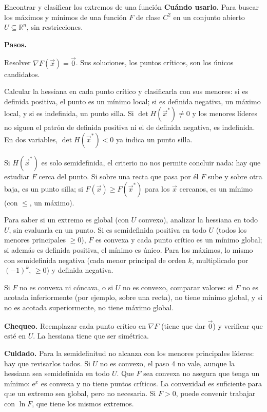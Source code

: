 \documentclass{article}
\newcommand{\rotulo}[2][principal]{\textsf{\bfseries\color{#1}#2}\enspace}
\newcommand{\R}{\ensuremath{\mathbb{R}}}
\newcommand{\vect}[1]{\vec{#1}}
\begin{document}
\begin{metodo}[label=met:opt-libre]{Encontrar y clasificar los extremos de una función}
\rotulo{Cuándo usarlo.} Para buscar los máximos y mínimos de una función \(F\) de clase \(C^2\) en un conjunto abierto \(U\subseteq\R^n\), sin restricciones.

\rotulo{Pasos.}
\begin{pasos}
  \item Resolver \(\nabla F(\vect{x})=\vect{0}\). Sus soluciones, los puntos críticos, son los únicos candidatos.
  \item Calcular la hessiana en cada punto crítico y clasificarla con sus menores: si es definida positiva, el punto es un mínimo local; si es definida negativa, un máximo local, y si es indefinida, un punto silla. Si \(\det H(\vect{x}^*)\neq0\) y los menores líderes no siguen el patrón de definida positiva ni el de definida negativa, es indefinida. En dos variables, \(\det H(\vect{x}^*)<0\) ya indica un punto silla.
  \item Si \(H(\vect{x}^*)\) es solo semidefinida, el criterio no nos permite concluir nada: hay que estudiar \(F\) cerca del punto. Si sobre una recta que pasa por él \(F\) sube y sobre otra baja, es un punto silla; si \(F(\vect{x})\ge F(\vect{x}^*)\) para los \(\vect{x}\) cercanos, es un mínimo (con \(\le\), un máximo).
  \item Para saber si un extremo es global (con \(U\) convexo), analizar la hessiana en todo \(U\), sin evaluarla en un punto. Si es semidefinida positiva en todo \(U\) (todos los menores principales \(\ge0\)), \(F\) es convexa y cada punto crítico es un mínimo global; si además es definida positiva, el mínimo es único. Para los máximos, lo mismo con semidefinida negativa (cada menor principal de orden \(k\), multiplicado por \((-1)^k\), \(\ge0\)) y definida negativa.
  \item Si \(F\) no es convexa ni cóncava, o si \(U\) no es convexo, comparar valores: si \(F\) no es acotada inferiormente (por ejemplo, sobre una recta), no tiene mínimo global, y si no es acotada superiormente, no tiene máximo global.
\end{pasos}

\rotulo{Chequeo.} Reemplazar cada punto crítico en \(\nabla F\) (tiene que dar \(\vect{0}\)) y verificar que esté en \(U\). La hessiana tiene que ser simétrica.

\rotulo[oxido]{Cuidado.} Para la semidefinitud no alcanza con los menores principales líderes: hay que revisarlos todos. Si \(U\) no es convexo, el paso 4 no vale, aunque la hessiana sea semidefinida en todo \(U\). Que \(F\) sea convexa no asegura que tenga un mínimo: \(\mathrm{e}^{x}\) es convexa y no tiene puntos críticos. La convexidad es suficiente para que un extremo sea global, pero no necesaria. Si \(F>0\), puede convenir trabajar con \(\ln F\), que tiene los mismos extremos.
\end{metodo}
\end{document}
